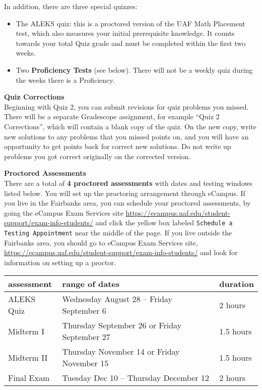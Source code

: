 \documentclass[12pt]{article}
\renewcommand{\emph}[1]{\textsf{\textbf{#1}}}
\newcommand{\localhead}[1]{\par\smallskip\textbf{#1}\nobreak\\}%
\def\heading#1{\localhead{\large\emph{#1}}}
\begin{document}
In addition, there are three special quizzes:
\begin{itemize}
\item The ALEKS quiz: this is a proctored version of the UAF Math Placement test, which also measures your initial prerequisite knowledge. It counts towards your total Quiz grade and must be completed within the first two weeks.
\item Two \emph{Proficiency Tests} (see below). There will not be a weekly quiz during the weeks there is a Proficiency.
\end{itemize}

\pagebreak

\heading{Quiz Corrections}
Beginning with Quiz 2, you can submit revisions for quiz problems you missed. There will be a separate Gradescope assignment, for example ``Quiz 2 Corrections'', which will contain a blank copy of the quiz. On the new copy, write new solutions to any problems that you missed points on, and you will have an opportunity to get points back for correct new solutions. Do not write up problems you got correct originally on the corrected version.

\heading{Proctored Assessments}
There are a total of \emph{4 proctored assessments} with dates and testing windows listed below. You will set up the proctoring arrangement through eCampus.
If you live in the Fairbanks area, you can schedule your proctored assessments, by going the eCampus Exam Services site \url{ https://ecampus.uaf.edu/student-support/exam-info-students/} and click the yellow box labeled {\tt{Schedule a Testing Appointment}} near the middle of the page. If you live outside the Fairbanks area, you should go to eCampus Exam Services site, \url{ https://ecampus.uaf.edu/student-support/exam-info-students/} and look for information on setting up a proctor.

\begin{center}
\begin{tabular}{| l | l | l |}
\hline
assessment & range of dates & duration \\
\hline \hline
ALEKS Quiz & Wednesday August 28 -- Friday September 6 & 2 hours\\
\hline
Midterm I & Thursday September 26 or Friday September 27 & 1.5 hours \\
\hline
Midterm II & Thursday November 14 or Friday November 15 & 1.5 hours \\
\hline
Final Exam & Tuesday Dec 10 -- Thursday December 12& 2 hours \\
\hline
\end{tabular}
\end{center}
\end{document}
